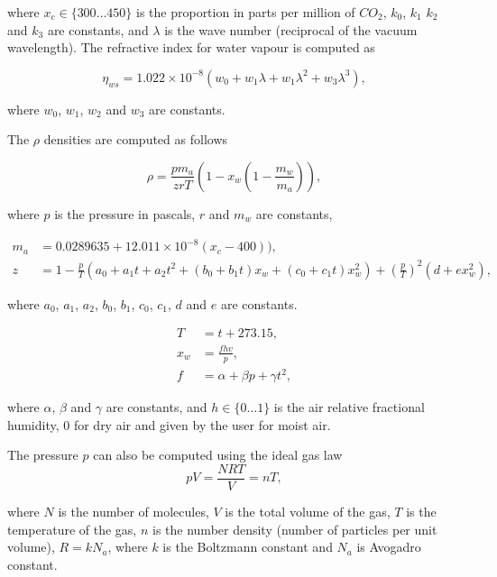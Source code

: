where $x_c \in \lbrace 300 \ldots 450 \rbrace $ is the proportion in parts per million of $CO_2$, $k_0$, $k_1$ $k_2$ and $k_3$ are constants, and $\lambda$ is the wave number (reciprocal of the vacuum wavelength).
The refractive index for water vapour is computed as

\begin{equation}
\label{eq:ciddor_eta_ws}
\eta_{ws} = 1.022 \times 10^{-8} \left( w_0 + w_1 \lambda + w_1 \lambda^2 + w_3 \lambda^3 \right),
\end{equation}

where $w_0$, $w_1$, $w_2$ and $w_3$ are constants.

The $\rho$ densities are computed as follows

\begin{equation}
\label{eq:ciddor_rho}
\rho =  \frac{p m_a}{zrT} \left( 1 - x_w \left(1 - \frac{m_w}{m_a} \right) \right), 
\end{equation}

where $p$ is the pressure in pascals, $r$ and $m_w$ are constants, 

\begin{align}
\label{eq:ciddor_m_a}
m_a &= 0.0289635 + 12.011 \times 10^{-8}(x_c - 400)),\\
\label{eq:ciddor_z}
z &= 1 - \frac{p}{T} \left(a_0 + a_1 t + a_2 t^2 + \left(b_0 + b_1 t \right) x_w + \left(c_0 + c_1 t \right) x_w^2 \right) + \left( \frac{p}{T} \right)^2 \left( d + ex_w^2 \right),
\end{align}

where $a_0$,  $a_1$, $a_2$,  $b_0$,  $b_1$,  $c_0$,  $c_1$,  $d$ and $e$ are constants.

\begin{align}
\label{eq:ciddor_t}
T &= t + 273.15, \\
\label{eq:ciddor_x_w}
x_w &= \frac{f h v}{ p}, \\
\label{eq:ciddor_f}
f &= \alpha + \beta p + \gamma t^2,
\end{align}

where $\alpha$, $\beta$ and $\gamma$ are constants, and $h \in \lbrace 0 \ldots 1 \rbrace$ is the air relative fractional humidity, $0$ for dry air and given by the user for moist air.

The pressure $p$ can also be computed using the ideal gas law
\begin{equation}
\label{eq:ciddor_p}
pV=\frac{NRT}{V} = n T,
\end{equation}

where $N$ is the number of molecules, $V$ is the total volume of the gas, $T$ is the temperature of the gas, $n$ is the number density (number of particles per unit volume), $R = k N_a$, where $k$ is the Boltzmann constant and $N_a$ is Avogadro constant.


